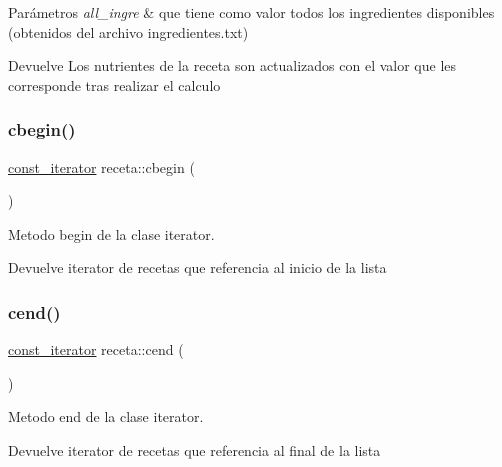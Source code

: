 \begin{DoxyParams}{Parámetros}
{\em all\+\_\+ingre} & que tiene como valor todos los ingredientes disponibles (obtenidos del archivo ingredientes.\+txt) \\
\hline
\end{DoxyParams}
\begin{DoxyReturn}{Devuelve}
Los nutrientes de la receta son actualizados con el valor que les corresponde tras realizar el calculo 
\end{DoxyReturn}
\mbox{\label{classreceta_a0f9d5839b4e8ef5f54bb3971e556d16e}} 
\subsubsection{\texorpdfstring{cbegin()}{cbegin()}}
{\footnotesize\ttfamily \hyperlink{classreceta_1_1const__iterator}{const\+\_\+iterator} receta\+::cbegin (\begin{DoxyParamCaption}{ }\end{DoxyParamCaption})\hspace{0.3cm}{\ttfamily [inline]}}



Metodo begin de la clase iterator. 

\begin{DoxyReturn}{Devuelve}
iterator de recetas que referencia al inicio de la lista 
\end{DoxyReturn}
\mbox{\label{classreceta_ad35b2055dedaa4bef8373d276f9fef77}} 
\subsubsection{\texorpdfstring{cend()}{cend()}}
{\footnotesize\ttfamily \hyperlink{classreceta_1_1const__iterator}{const\+\_\+iterator} receta\+::cend (\begin{DoxyParamCaption}{ }\end{DoxyParamCaption})\hspace{0.3cm}{\ttfamily [inline]}}



Metodo end de la clase iterator. 

\begin{DoxyReturn}{Devuelve}
iterator de recetas que referencia al final de la lista 
\end{DoxyReturn}
\mbox{\label{classreceta_ac19cd88e0a062f983baa0cc5c4bfca3c}} 
